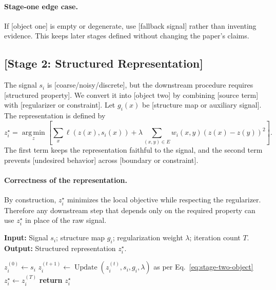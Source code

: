 \paragraph{Stage-one edge case.}
If [object one] is empty or degenerate, use [fallback signal] rather than inventing evidence. This keeps later stages defined without changing the paper's claims.

\subsection{[Stage 2: Structured Representation]}\label{sec:stage-two}

The signal $s_i$ is [coarse/noisy/discrete], but the downstream procedure requires [structured property]. We convert it into [object two] by combining [source term] with [regularizer or constraint]. Let $g_i(x)$ be [structure map or auxiliary signal]. The representation is defined by
\begin{equation}\label{eq:stage-two-object}
    z_i^{\star}
    =
    \operatorname*{arg\,min}_{z}
    \left[
        \sum_x \ell(z(x), s_i(x))
        +
        \lambda \sum_{(x,y)\in E} w_i(x,y)(z(x)-z(y))^2
    \right].
\end{equation}
The first term keeps the representation faithful to the signal, and the second term prevents [undesired behavior] across [boundary or constraint].

\paragraph{Correctness of the representation.}
By construction, $z_i^{\star}$ minimizes the local objective while respecting the regularizer. Therefore any downstream step that depends only on the required property can use $z_i^{\star}$ in place of the raw signal.

\begin{algorithm}[tb]
\small
\caption{[Object Two] Construction}
\label{alg:stage-two}
\begin{flushleft}
\hspace*{0.02in} \textbf{Input:}
Signal $s_i$;
structure map $g_i$;
regularization weight $\lambda$;
iteration count $T$.\\
\hspace*{0.02in} \textbf{Output:}
Structured representation $z_i^{\star}$.
\end{flushleft}
\begin{algorithmic}[1]
    \State $z_i^{(0)} \gets s_i$
        \State $z_i^{(t+1)} \gets \operatorname{Update}(z_i^{(t)}, s_i, g_i, \lambda)$ as per Eq.~\ref{eq:stage-two-object}
    \EndFor
    \State $z_i^{\star} \gets z_i^{(T)}$
    \State \textbf{return} $z_i^{\star}$
\end{algorithmic}
\end{algorithm}

